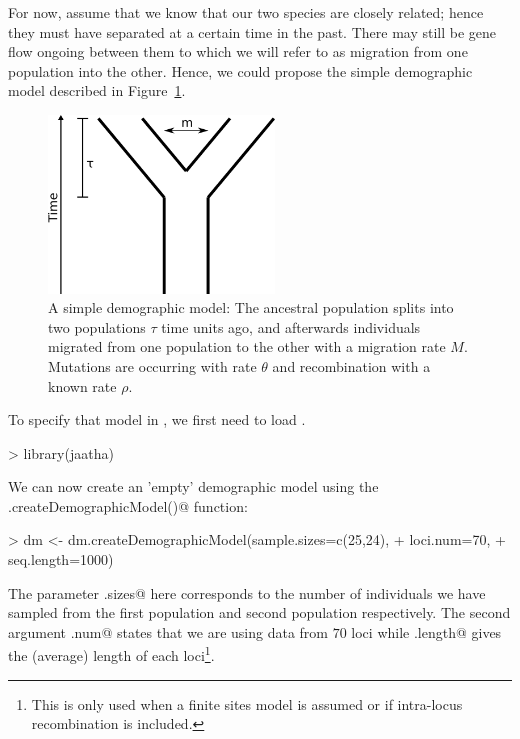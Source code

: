 \documentclass[a4paper]{article}
\begin{document}
For now, assume that we know that our two species are closely related; hence they must 
have separated at a certain time in the past. There may still be gene flow
ongoing between them 
to which we will refer to as migration from one population into the other. 
Hence, we could propose the simple demographic model described in Figure~\ref{fig:dm}.

\begin{figure}
\begin{center}
\includegraphics[width=60mm]{img/dm.png}
\end{center}
\caption{
A simple demographic model: The ancestral population splits into two populations $\tau$ time 
units ago, and afterwards individuals migrated from one population to the other with a 
migration rate $M$. Mutations are occurring with rate $\theta$ and recombination with a 
known rate $\rho$.}
\label{fig:dm}
\end{figure}

To specify that model in \verb@R@, we first need to load \verb@jaatha@.
\begin{Schunk}
\begin{Sinput}
> library(jaatha)
\end{Sinput}
\end{Schunk}
We can now create an 'empty' demographic model \verb@dm@ using the\\ 
\verb@dm.createDemographicModel()@ function:

\begin{Schunk}
\begin{Sinput}
> dm <- dm.createDemographicModel(sample.sizes=c(25,24), 
+                                 loci.num=70,
+                                 seq.length=1000)
\end{Sinput}
\end{Schunk}

The parameter \verb@sample.sizes@ here corresponds to the number of individuals we have
sampled from the first population and second population respectively. The 
second argument \verb@loci.num@ states that we are using data from $70$ loci
while \verb@seq.length@ gives the (average) length of each loci\footnote{This 
is only used when a finite sites model is assumed or if intra-locus recombination is included.}.
\end{document}
